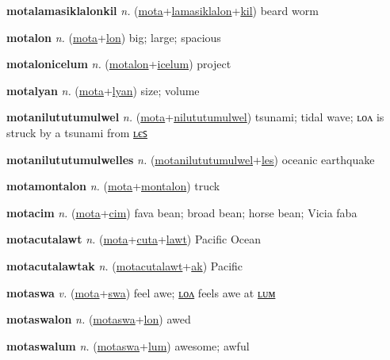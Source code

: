 \textbf{\hypertarget{motalamasiklalonkil}{motalamasiklalonkil}} \textit{n.} (\hyperlink{mota}{mota}+\allowbreak \hyperlink{lamasiklalon}{lamasiklalon}+\allowbreak \hyperlink{kil}{kil})
beard worm

\textbf{\hypertarget{motalon}{motalon}} \textit{n.} (\hyperlink{mota}{mota}+\allowbreak \hyperlink{lon}{lon})
big; large; spacious

\textbf{\hypertarget{motalonicelum}{motalonicelum}} \textit{n.} (\hyperlink{motalon}{motalon}+\allowbreak \hyperlink{icelum}{icelum})
project

\textbf{\hypertarget{motalyan}{motalyan}} \textit{n.} (\hyperlink{mota}{mota}+\allowbreak \hyperlink{lyan}{lyan})
size; volume

\textbf{\hypertarget{motanilututumulwel}{motanilututumulwel}} \textit{n.} (\hyperlink{mota}{mota}+\allowbreak \hyperlink{nilututumulwel}{nilututumulwel})
tsunami; tidal wave; ʟᴏᴧ is struck by a tsunami from \hyperlink{motanilututumulwelles}{ʟєꜱ}

\textbf{\hypertarget{motanilututumulwelles}{motanilututumulwelles}} \textit{n.} (\hyperlink{motanilututumulwel}{motanilututumulwel}+\allowbreak \hyperlink{les}{les})
oceanic earthquake

\textbf{\hypertarget{motamontalon}{motamontalon}} \textit{n.} (\hyperlink{mota}{mota}+\allowbreak \hyperlink{montalon}{montalon})
truck

\textbf{\hypertarget{motacim}{motacim}} \textit{n.} (\hyperlink{mota}{mota}+\allowbreak \hyperlink{cim}{cim})
fava bean; broad bean; horse bean; Vicia faba

\textbf{\hypertarget{motacutalawt}{motacutalawt}} \textit{n.} (\hyperlink{mota}{mota}+\allowbreak \hyperlink{cuta}{cuta}+\allowbreak \hyperlink{lawt}{lawt})
Pacific Ocean

\textbf{\hypertarget{motacutalawtak}{motacutalawtak}} \textit{n.} (\hyperlink{motacutalawt}{motacutalawt}+\allowbreak \hyperlink{ak}{ak})
Pacific

\textbf{\hypertarget{motaswa}{motaswa}} \textit{v.} (\hyperlink{mota}{mota}+\allowbreak \hyperlink{swa}{swa})
feel awe; \hyperlink{motaswalon}{ʟᴏᴧ} feels awe at \hyperlink{motaswalum}{ʟᴜᴍ}

\textbf{\hypertarget{motaswalon}{motaswalon}} \textit{n.} (\hyperlink{motaswa}{motaswa}+\allowbreak \hyperlink{lon}{lon})
awed

\textbf{\hypertarget{motaswalum}{motaswalum}} \textit{n.} (\hyperlink{motaswa}{motaswa}+\allowbreak \hyperlink{lum}{lum})
awesome; awful

